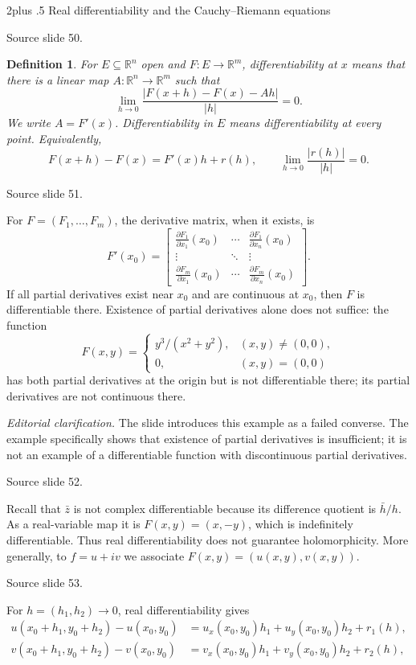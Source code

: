 \documentclass[10pt,letterpaper,twoside,openright]{amsbook}
\makeatletter
\numberwithin{equation}{subsection}
\renewcommand{\section}{\@startsection{section}{1}
 {\z@}{2\baselineskip plus .5\baselineskip}
 {\baselineskip}{\normalfont\Large\bfseries\centering}}
\theoremstyle{sea-plain}
\theoremstyle{sea-definition}
\newtheorem{definition}[subsection]{Definition}
\theoremstyle{sea-exercise}
\newcommand{\RR}{\mathbb{R}}
\newcommand{\src}[1]{\par\smallskip\noindent
 {\scriptsize\sffamily\color{SoftWhite}Source slide #1.}\par\nopagebreak\smallskip}
\newcommand{\editorial}[1]{\par\smallskip\noindent
 {\small\textit{Editorial clarification.} #1}\par\smallskip}
\makeatother
\begin{document}
\section{Real differentiability and the Cauchy--Riemann equations}
\src{50}
\begin{definition}
For $E\subseteq\RR^n$ open and $F:E\to\RR^m$, differentiability at $x$
means that there is a linear map $A:\RR^n\to\RR^m$ such that
\[
 \lim_{h\to0}\frac{|F(x+h)-F(x)-Ah|}{|h|}=0.
\]
We write $A=F'(x)$. Differentiability in $E$ means differentiability at every
point. Equivalently,
\[
 F(x+h)-F(x)=F'(x)h+r(h),\qquad \lim_{h\to0}\frac{|r(h)|}{|h|}=0.
\]
\end{definition}
\src{51}
For $F=(F_1,\ldots,F_m)$, the derivative matrix, when it exists, is
\[
 F'(x_0)=\begin{bmatrix}
 \frac{\partial F_1}{\partial x_1}(x_0)&\cdots&
 \frac{\partial F_1}{\partial x_n}(x_0)\\
 \vdots&\ddots&\vdots\\
 \frac{\partial F_m}{\partial x_1}(x_0)&\cdots&
 \frac{\partial F_m}{\partial x_n}(x_0)
 \end{bmatrix}.
\]
If all partial derivatives exist near $x_0$ and are continuous at $x_0$,
then $F$ is differentiable there. Existence of partial derivatives alone
does not suffice: the function
\[
 F(x,y)=\begin{cases}y^3/(x^2+y^2),&(x,y)\ne(0,0),\\0,&(x,y)=(0,0)\end{cases}
\]
has both partial derivatives at the origin but is not differentiable
there; its partial derivatives are not continuous there.
\editorial{The slide introduces this example as a failed converse.
The example specifically shows that existence of partial derivatives is
insufficient; it is not an example of a differentiable function with
discontinuous partial derivatives.}
\src{52}
Recall that $\bar z$ is not complex differentiable because its difference
quotient is $\bar h/h$. As a real-variable map it is $F(x,y)=(x,-y)$,
which is indefinitely differentiable. Thus real differentiability does not
guarantee holomorphicity. More generally, to $f=u+iv$ we associate
$F(x,y)=(u(x,y),v(x,y))$.
\src{53}
For $h=(h_1,h_2)\to0$, real differentiability gives
\[
\begin{aligned}
u(x_0+h_1,y_0+h_2)-u(x_0,y_0)
 &=u_x(x_0,y_0)h_1+u_y(x_0,y_0)h_2+r_1(h),\\
v(x_0+h_1,y_0+h_2)-v(x_0,y_0)
 &=v_x(x_0,y_0)h_1+v_y(x_0,y_0)h_2+r_2(h),
\end{aligned}
\]
\end{document}
